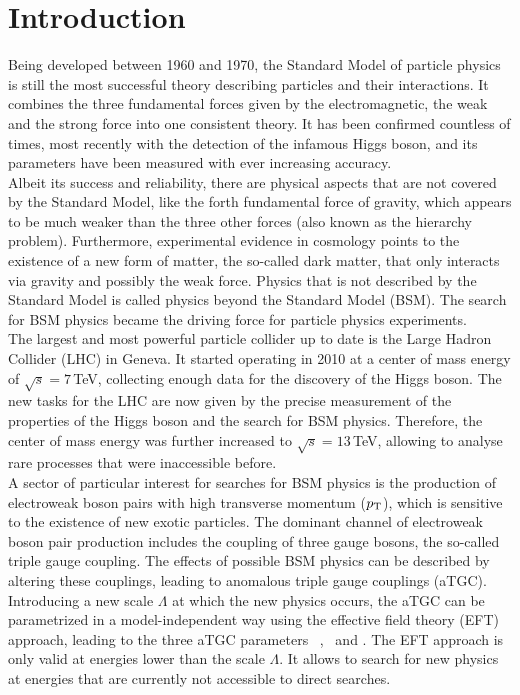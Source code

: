 \chapter*{Introduction}
Being developed between 1960 and 1970, the Standard Model of particle physics is still the most successful theory describing particles and their interactions. It combines the three fundamental forces given by the electromagnetic, the weak and the strong force into one consistent theory. It has been confirmed countless of times, most recently with the detection of the infamous Higgs boson, and its parameters have been measured with ever increasing accuracy.\\

Albeit its success and reliability, there are physical aspects that are not covered by the Standard Model, like the forth fundamental force of gravity, which appears to be much weaker than the three other forces (also known as the hierarchy problem). Furthermore, experimental evidence in cosmology points to the existence of a new form of matter, the so-called dark matter, that only interacts via gravity and possibly the weak force. Physics that is not described by the Standard Model is called physics beyond the Standard Model (BSM). The search for BSM physics became the driving force for particle physics experiments.\\

The largest and most powerful particle collider up to date is the Large Hadron Collider (LHC) in Geneva. It started operating in 2010 at a center of mass energy of $\sqrt{s}=7$\,TeV, collecting enough data for the discovery of the Higgs boson. The new tasks for the LHC are now given by the precise measurement of the properties of the Higgs boson and the search for BSM physics. Therefore, the center of mass energy was further increased to $\sqrt{s}=13$\,TeV, allowing to analyse rare processes that were inaccessible before.\\

A sector of particular interest for searches for BSM physics is the production of electroweak boson pairs with high transverse momentum ($p_{\rm T}$), which is sensitive to the existence of new exotic particles. The dominant channel of electroweak boson pair production includes the coupling of three gauge bosons, the so-called triple gauge coupling. The effects of possible BSM physics can be described by altering these couplings, leading to anomalous triple gauge couplings (aTGC). Introducing a new scale $\Lambda$ at which the new physics occurs, the aTGC can be parametrized in a model-independent way using the effective field theory (EFT) approach, leading to the three aTGC parameters \Tcwww \ , \Tccw \ and \Tcb . The EFT approach is only valid at energies lower than the scale $\Lambda$. It allows to search for new physics at energies that are currently not accessible to direct searches.\\

